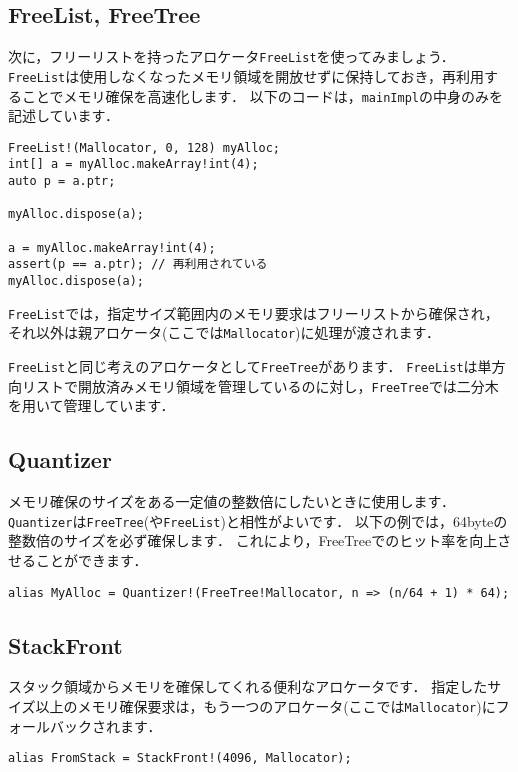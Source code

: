 \subsection{FreeList, FreeTree}

次に，フリーリストを持ったアロケータ\texttt{FreeList}を使ってみましょう．
\texttt{FreeList}は使用しなくなったメモリ領域を開放せずに保持しておき，再利用することでメモリ確保を高速化します．
以下のコードは，\texttt{mainImpl}の中身のみを記述しています．

\begin{lstlisting}
FreeList!(Mallocator, 0, 128) myAlloc;
int[] a = myAlloc.makeArray!int(4);
auto p = a.ptr;

myAlloc.dispose(a);

a = myAlloc.makeArray!int(4);
assert(p == a.ptr); // 再利用されている
myAlloc.dispose(a);
\end{lstlisting}

\texttt{FreeList}では，指定サイズ範囲内のメモリ要求はフリーリストから確保され，それ以外は親アロケータ(ここでは\texttt{Mallocator})に処理が渡されます．

\texttt{FreeList}と同じ考えのアロケータとして\texttt{FreeTree}があります．
\texttt{FreeList}は単方向リストで開放済みメモリ領域を管理しているのに対し，\texttt{FreeTree}では二分木を用いて管理しています．

\subsection{Quantizer}

メモリ確保のサイズをある一定値の整数倍にしたいときに使用します．
\texttt{Quantizer}は\texttt{FreeTree}(や\texttt{FreeList})と相性がよいです．
以下の例では，64byteの整数倍のサイズを必ず確保します．
これにより，FreeTreeでのヒット率を向上させることができます．

\begin{lstlisting}
alias MyAlloc = Quantizer!(FreeTree!Mallocator, n => (n/64 + 1) * 64);
\end{lstlisting}

\subsection{StackFront}

スタック領域からメモリを確保してくれる便利なアロケータです．
指定したサイズ以上のメモリ確保要求は，もう一つのアロケータ(ここでは\texttt{Mallocator})にフォールバックされます．

\begin{lstlisting}
alias FromStack = StackFront!(4096, Mallocator);
\end{lstlisting}

